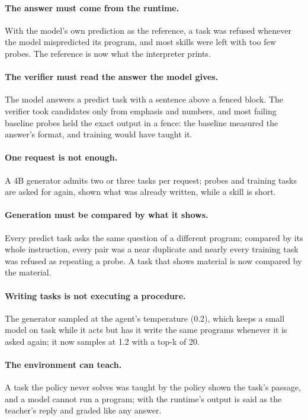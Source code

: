 \paragraph{The answer must come from the runtime.} With the model's own prediction as
the reference, a task was refused whenever the model mispredicted its program, and most
skills were left with too few probes. The reference is now what the interpreter
prints.

\paragraph{The verifier must read the answer the model gives.} The model answers a
predict task with a sentence above a fenced block. The verifier took candidates only
from emphasis and numbers, and most failing baseline probes held the exact output in a
fence: the baseline measured the answer's format, and training would have taught it.

\paragraph{One request is not enough.} A 4B generator admits two or three tasks per
request; probes and training tasks are asked for again, shown what was already written,
while a skill is short.

\paragraph{Generation must be compared by what it shows.} Every predict task asks the
same question of a different program; compared by its whole instruction, every pair was a
near duplicate and nearly every training task was refused as repeating a probe.
A task that shows material is now compared by the material.

\paragraph{Writing tasks is not executing a procedure.} The generator sampled at the
agent's temperature (0.2), which keeps a small model on task while it acts but has it
write the same programs whenever it is asked again; it now samples at 1.2 with a top-k of
20.

\paragraph{The environment can teach.} A task the policy never solves was taught by the
policy shown the task's passage, and a model cannot run a program; with
 the runtime's output is said as the teacher's reply and graded
like any answer.


